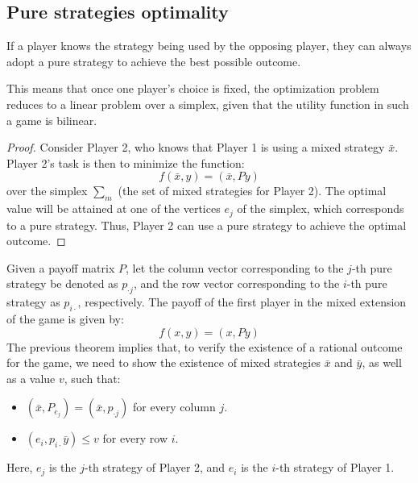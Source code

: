 \subsection{Pure strategies optimality}
\begin{theorem}
    If a player knows the strategy being used by the opposing player, they can always adopt a pure strategy to achieve the best possible outcome.
\end{theorem}
This means that once one player's choice is fixed, the optimization problem reduces to a linear problem over a simplex, given that the utility function in such a game is bilinear.
\begin{proof}
    Consider Player 2, who knows that Player 1 is using a mixed strategy $\bar{x}$. 
    Player 2's task is then to minimize the function:
    \[f (\bar{x}, y) = (\bar{x}, Py)\]
    over the simplex $\sum_m$ (the set of mixed strategies for Player 2). 
    The optimal value will be attained at one of the vertices $e_j$ of the simplex, which corresponds to a pure strategy.
    Thus, Player 2 can use a pure strategy to achieve the optimal outcome.
\end{proof}
Given a payoff matrix  $P$, let the column vector corresponding to the $j$-th pure strategy be denoted as $p_{\cdot j}$, and the row vector corresponding to the $i$-th pure strategy as $p_{i\cdot}$, respectively. 
The payoff of the first player in the mixed extension of the game is given by:
\[f(x,y)=(x,Py)\]
The previous theorem implies that, to verify the existence of a rational outcome for the game, we need to show the existence of mixed strategies $\bar{x}$ and $\bar{y}$, as well as a value $v$, such that: 
\begin{itemize}
    \item $(\bar{x},P_{e_j})=(\bar{x},p_{\cdot j})$ for every column $j$. 
    \item $(e_i,p_{i\cdot}\bar{y})\leq v$ for every row $i$.
\end{itemize}
Here, $e_j$ is the $j$-th strategy of Player 2, and $e_i$ is the $i$-th strategy of Player 1.
